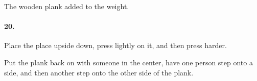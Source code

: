         \begin{mdframed}
            The wooden plank added to the weight.
        \end{mdframed}

        \paragraph*{20.}

        \begin{mdframed}
            Place the place upside down, press lightly on it, and then press harder.

            Put the plank back on with someone in the center, have one person step onto a side, and then another step onto the other side of the plank.
        \end{mdframed}

